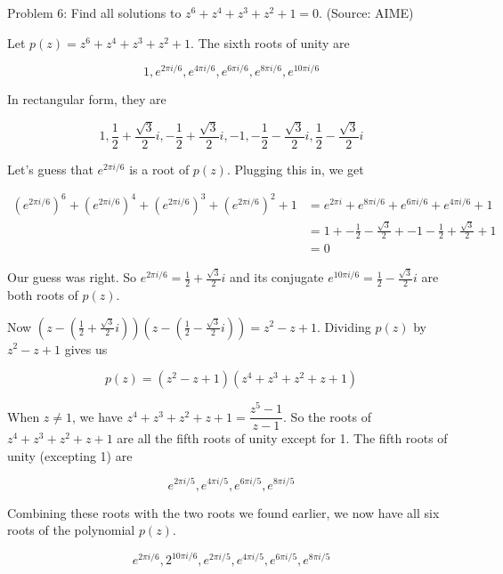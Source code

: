 Problem 6: Find all solutions to $z^6 + z^4 + z^3 + z^2 + 1 = 0$. (Source: AIME)

Let $p(z) = z^6 + z^4 + z^3 + z^2 + 1$. The sixth roots of unity are

$$ 1, e^{2 \pi i / 6}, e^{4 \pi i / 6}, e^{6 \pi i / 6}, e^{8 \pi i / 6}, e^{10 \pi i / 6} $$

In rectangular form, they are

$$ 1, \frac{1}{2} + \frac{\sqrt 3}{2}i, -\frac{1}{2} + \frac{\sqrt 3}{2}i, -1, -\frac{1}{2} - \frac{\sqrt 3}{2}i, \frac{1}{2} - \frac{\sqrt 3}{2}i $$

Let's guess that $e^{2\pi i / 6}$ is a root of $p(z)$. Plugging this in, we get

\begin{align*}
(e^{2 \pi i / 6})^6 + (e^{2 \pi i / 6})^4 + (e^{2 \pi i / 6})^3 + (e^{2 \pi i / 6})^2 + 1 
&= e^{2 \pi i} + e^{8 \pi i / 6} + e^{6 \pi i / 6} + e^{4 \pi i / 6} + 1 \\
&= 1 + -\frac{1}{2} - \frac{\sqrt 3}{2} + -1 - \frac{1}{2} + \frac{\sqrt 3}{2} + 1 \\
&= 0
\end{align*}

Our guess was right. So $e^{2 \pi i / 6} = \frac{1}{2} + \frac{\sqrt 3}{2}i$ and its conjugate $e^{10 \pi i / 6} = \frac{1}{2} - \frac{\sqrt 3}{2}i$ are both roots of $p(z)$.

Now $(z - (\frac{1}{2} + \frac{\sqrt 3}{2}i))(z - (\frac{1}{2} - \frac{\sqrt 3}{2}i)) = z^2 - z + 1$. Dividing $p(z)$ by $z^2 - z + 1$ gives us

$$ p(z) = (z^2 - z + 1)(z^4 + z^3 + z^2 + z + 1) $$

When $z \neq 1$, we have $z^4 + z^3 + z^2 + z + 1 = \dfrac{z^5 - 1}{z - 1}$. So the roots of $z^4 + z^3 + z^2 + z + 1$ are all the fifth roots of unity except for 1. The fifth roots of unity (excepting 1) are

$$ e^{2 \pi i / 5}, e^{4 \pi i / 5}, e^{6 \pi i / 5}, e^{8 \pi i / 5} $$

Combining these roots with the two roots we found earlier, we now have all six roots of the polynomial $p(z)$.

$$ \boxed{e^{2 \pi i / 6}, 2^{10 \pi i / 6}, e^{2 \pi i / 5}, e^{4 \pi i / 5}, e^{6 \pi i / 5}, e^{8 \pi i / 5}} $$
